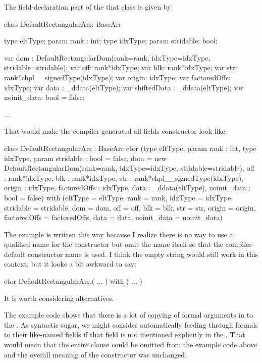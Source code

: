 The field-declaration part of the that class is given by:
\begin{chapel}
  class DefaultRectangularArr: BaseArr {
    type eltType;
    param rank : int;
    type idxType;
    param stridable: bool;
  
    var dom : DefaultRectangularDom(rank=rank, idxType=idxType,
                                           stridable=stridable);
    var off: rank*idxType;
    var blk: rank*idxType;
    var str: rank*chpl__signedType(idxType);
    var origin: idxType;
    var factoredOffs: idxType;
    var data : _ddata(eltType);
    var shiftedData : _ddata(eltType);
    var noinit_data: bool = false;

    ...
  }
\end{chapel}
That would make the compiler-generated all-fields constructor look like:
\begin{chapel}
class DefaultRectangularArr : BaseArr {
  ctor (type eltType,
        param rank : int,
        type idxType,
        param stridable : bool = false,
        dom = new DefaultRectangularDom(rank=rank, idxType=idxType,
                                         stridable=stridable),
        off : rank*idxType,
        blk : rank*idxType,
        str : rank*chpl__signedType(idxType),
        origin : idxType,
        factoredOffs : idxType,
        data : _ddata(eltType),
        noinit_data : bool = false)
    with (eltType = eltType,
          rank = rank,
          idxType = idxType,
          stridable = stridable,
          dom = dom,
          off = off,
          blk = blk,
          str = str,
          origin = origin,
          factoredOffs = factoredOffs,
          data = data,
          noinit_data = noinit_data) {}
}
\end{chapel}

\begin{openissue}
The example is written this way because I realize there is no way to use a qualified name
for the constructor but omit the name itself so that the compiler-default constructor name
is used.  I think the empty string would still work in this context, but it looks a bit
awkward to say:
\begin{chapel}
ctor DefaultRectangularArr.( ... ) with ( ... ) {}
\end{chapel}
It is worth considering alternatives.
\end{openissue}

\begin{openissue}

The example code shows that there is a lot of copying of formal arguments in to the
.  As syntactic sugar, we might consider automatically feeding
through formals to their like-named fields if that field is not mentioned explicitly in
the .  That would mean that the entire  clause could
be omitted from the example code above and the overall meaning of the constructor was
unchanged.
\end{openissue}

